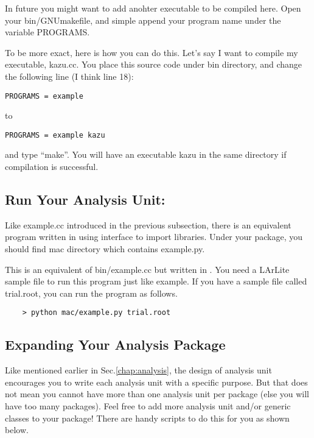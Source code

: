 In future you might want to add anohter executable to be compiled here.
Open your bin/GNUmakefile, and simple append your program name under the variable {\ttfamily PROGRAMS}.

To be more exact, here is how you can do this. Let's say I want to compile my executable, {\ttfamily kazu.cc}.
You place this source code under {\ttfamily bin} directory, and change the following line (I think line 18):
\begin{lstlisting}
PROGRAMS = example
\end{lstlisting}
to
\begin{lstlisting}
PROGRAMS = example kazu
\end{lstlisting}
and type ``make''. 
You will have an executable {\ttfamily kazu} in the same directory if compilation is successful.

\subsection{Run Your Analysis Unit: \PyROOT}
\label{sec:yourrunscript}
Like {\ttfamily example.cc} introduced in the previous subsection, there is an equivalent program
written in \python using \PyROOT interface to import \CPP libraries. Under your package, you 
should find {\ttfamily mac} directory which contains {\ttfamily example.py}.

This is an equivalent of {\ttfamily bin/example.cc} but written in \python. You need a LArLite
sample \ROOT file to run this program just like {\ttfamily example}. If you have a sample file
called {\ttfamily trial.root}, you can run the program as follows.
\begin{lstlisting}
    > python mac/example.py trial.root
\end{lstlisting}

\subsection{Expanding Your Analysis Package}
Like mentioned earlier in Sec.\ref{chap:analysis}, the design of analysis unit encourages you to write
each analysis unit with a specific purpose. But that does not mean you cannot have more than one
analysis unit per package (else you will have too many packages). Feel free to add more analysis unit 
and/or generic \CPP classes to your package! There are handy scripts to do this for you as shown below.

